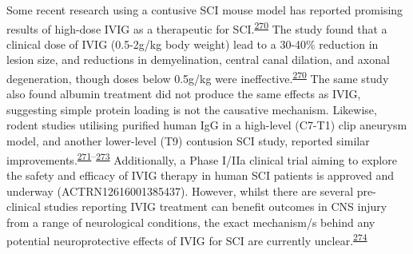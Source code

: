 \documentclass[
]{article}
\begin{document}
Some recent research using a contusive SCI mouse model has reported promising results of high-dose IVIG as a therapeutic for SCI.\textsuperscript{\protect\hyperlink{ref-brennan_ivig_2016}{270}}
The study found that a clinical dose of IVIG (0.5-2g/kg body weight) lead to a 30-40\% reduction in lesion size, and reductions in demyelination, central canal dilation, and axonal degeneration, though doses below 0.5g/kg were ineffective.\textsuperscript{\protect\hyperlink{ref-brennan_ivig_2016}{270}}
The same study also found albumin treatment did not produce the same effects as IVIG, suggesting simple protein loading is not the causative mechanism.
Likewise, rodent studies utilising purified human IgG in a high-level (C7-T1) clip aneurysm model, and another lower-level (T9) contusion SCI study, reported similar improvements.\textsuperscript{\protect\hyperlink{ref-nguyen_immunoglobulin_2012}{271}--\protect\hyperlink{ref-gok_immunomodulation_2009}{273}}
Additionally, a Phase I/IIa clinical trial aiming to explore the safety and efficacy of IVIG therapy in human SCI patients is approved and underway (ACTRN12616001385437).
However, whilst there are several pre-clinical studies reporting IVIG treatment can benefit outcomes in CNS injury from a range of neurological conditions, the exact mechanism/s behind any potential neuroprotective effects of IVIG for SCI are currently unclear.\textsuperscript{\protect\hyperlink{ref-tzekou_treatment_2014}{274}}
\end{document}
